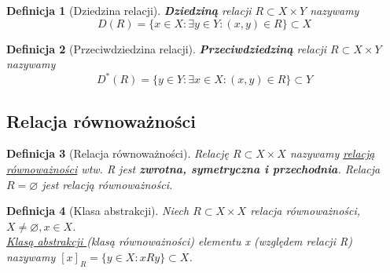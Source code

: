 \documentclass[a5paper,8pt]{article}
\theoremstyle{mythmstyle}
\newtheorem{definition}{Definicja}[section]
\begin{document}
            \begin{definition}[Dziedzina relacji]
                \textbf{Dziedziną} relacji $ R \subset X \times Y $ nazywamy
                \begin{equation*}
                    D(R) = \{ x \in X : \exists y \in Y : (x, y) \in R \} \subset X
                \end{equation*}
            \end{definition}

            \begin{definition}[Przeciwdziedzina relacji]
                \textbf{Przeciwdziedziną} relacji $ R \subset X \times Y $ nazywamy
                \begin{equation*}
                    D^\ast(R) = \{ y \in Y : \exists x \in X : (x, y) \in R \} \subset Y
                \end{equation*}
                
            \end{definition}

            \subsection{Relacja równoważności} %
            \label{sub:relacja_równoważności}

            \begin{definition}[Relacja równoważności]
                Relację $ R \subset X \times X $ nazywamy \underline{relacją równoważności} wtw.
                R jest \textbf{zwrotna, symetryczna i przechodnia}. Relacja $ R = \varnothing $
                jest relacją równoważności.
            \end{definition}

            \begin{definition}[Klasa abstrakcji]
                Niech $ R \subset X \times X $ relacja równoważności, $ X \neq \varnothing, x \in X $. \\
                \underline{Klasą abstrakcji }(klasą równoważności) elementu x (względem relacji R)\\
                nazywamy $ [x]_R = \{ y \in X : x R y \} \subset X $.
            \end{definition}
\end{document}
